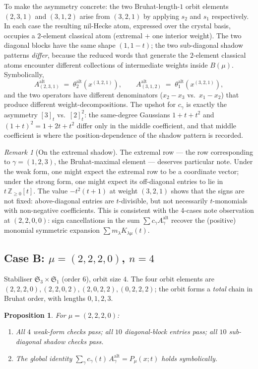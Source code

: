 \documentclass[11pt]{article}
\newtheorem{proposition}[theorem]{Proposition}
\theoremstyle{definition}
\theoremstyle{remark}
\newtheorem{remark}[theorem]{Remark}
\newcommand{\Aalt}{A^{\mathrm{alt}}}
\newcommand{\thetaalt}{\theta^{\mathrm{alt}}}
\newcommand{\ZZ}{\mathbb{Z}}
\newcommand{\qint}[1]{[#1]_t}
\begin{document}
To make the asymmetry concrete: the two Bruhat-length-$1$ orbit
elements $(2,3,1)$ and $(3,1,2)$ arise from $(3,2,1)$ by applying
$s_2$ and $s_1$ respectively. In each case the resulting nil-Hecke
atom, expressed over the crystal basis, occupies a $2$-element
classical atom (extremal $+$ one interior weight). The two
diagonal blocks have the same shape $(1, 1-t)$; the two
sub-diagonal shadow patterns \emph{differ}, because the reduced
words that generate the $2$-element classical atoms encounter
different collections of intermediate weights inside $B(\mu)$.
Symbolically,
\[
   \Aalt_{(2,3,1)} \;=\; \thetaalt_2(x^{(3,2,1)}), \qquad
   \Aalt_{(3,1,2)} \;=\; \thetaalt_1(x^{(3,2,1)}),
\]
and the two operators have different denominators
($x_2 - x_3$ vs.\ $x_1 - x_2$) that produce different
weight-decompositions. The upshot for $c_\gamma$ is exactly the
asymmetry $\qint{3}$ vs.\ $\qint{2}^2$: the same-degree Gaussians
$1 + t + t^2$ and $(1+t)^2 = 1 + 2t + t^2$ differ only in the
middle coefficient, and that middle coefficient is where the
position-dependence of the shadow pattern is recorded.

\begin{remark}[On the extremal shadow]
The extremal row --- the row corresponding to $\gamma = (1,2,3)$,
the Bruhat-maximal element --- deserves particular note. Under the
weak form, one might expect the extremal row to be a coordinate
vector; under the strong form, one might expect its off-diagonal
entries to lie in $t\, \ZZ_{\geq 0}[t]$. The value $-t^2(t+1)$ at
weight $(3,2,1)$ shows that the signs are not fixed: above-diagonal
entries are $t$-divisible, but not necessarily $t$-monomials with
non-negative coefficients. This is consistent with the 4-cases note
observation at $(2,2,0,0)$: sign cancellations in the sum
$\sum c_\gamma \Aalt_\gamma$ recover the (positive) monomial
symmetric expansion $\sum m_\lambda K_{\lambda\mu}(t)$.
\end{remark}

\subsection{Case B: $\mu = (2,2,2,0)$, $n = 4$}

Stabiliser $\mathfrak{S}_3 \times \mathfrak{S}_1$ (order $6$),
orbit size $4$. The four orbit elements are
$(2,2,2,0), (2,2,0,2), (2,0,2,2), (0,2,2,2)$; the orbit forms a
\emph{total} chain in Bruhat order, with lengths $0,1,2,3$.

\begin{proposition}\label{prop:2220}
For $\mu = (2,2,2,0)$:
\begin{enumerate}
\item[(i)]  All $4$ weak-form checks pass; all $10$ diagonal-block
            entries pass; all $10$ sub-diagonal shadow checks pass.
\item[(ii)] The global identity
            $\sum_\gamma c_\gamma(t)\,\Aalt_\gamma = P_\mu(x;t)$
            holds symbolically.
\end{enumerate}
\end{proposition}
\end{document}
